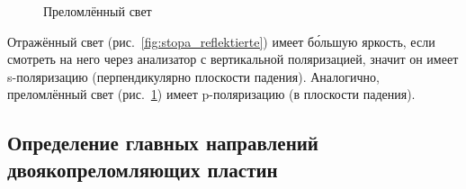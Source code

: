 \documentclass[a4paper, 12pt]{article}
\begin{document}
\begin{figure}[h!]
\begin{minipage}[h!]{0.3\linewidth}
		\end{minipage}
		\hfill
        \caption{Преломлённый свет}
        \label{fig:stopa_durchgehende}
\end{figure}

Отражённый свет (рис.~\ref{fig:stopa_reflektierte}) имеет б\'{о}льшую яркость, если смотреть на него через анализатор с вертикальной поляризацией, значит он имеет s-поляризацию (перпендикулярно плоскости падения). Аналогично, преломлённый свет (рис.~\ref{fig:stopa_durchgehende}) имеет p-поляризацию (в плоскости падения).

\newpage

\subsection{Определение главных направлений двоякопреломляющих пластин}
\end{document}
